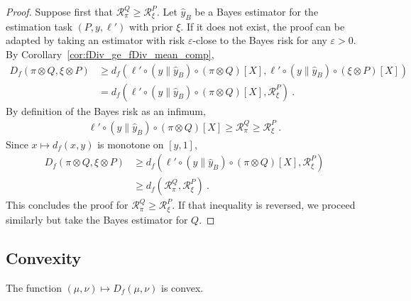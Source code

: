 \begin{proof}%
{}
Suppose first that $\mathcal R_\pi^Q \ge \mathcal R_\xi^P$.
Let $\hat{y}_B$ be a Bayes estimator for the estimation task $(P, y, \ell')$ with prior $\xi$. If it does not exist, the proof can be adapted by taking an estimator with risk $\varepsilon$-close to the Bayes risk for any $\varepsilon > 0$.
By Corollary~\ref{cor:fDiv_ge_fDiv_mean_comp},
\begin{align*}
D_f(\pi \otimes Q, \xi \otimes P)
&\ge d_f(\ell' \circ (y \parallel \hat{y}_B) \circ (\pi \otimes Q) [X], \ell' \circ (y \parallel \hat{y}_B) \circ (\xi \otimes P) [X])
\\
&= d_f(\ell' \circ (y \parallel \hat{y}_B) \circ (\pi \otimes Q) [X], \mathcal R_\xi^P)
\: .
\end{align*}
By definition of the Bayes risk as an infimum,
\begin{align*}
\ell' \circ (y \parallel \hat{y}_B) \circ (\pi \otimes Q) [X]
\ge \mathcal R_\pi^Q
\ge \mathcal R_\xi^P
\: .
\end{align*}
Since $x \mapsto d_f(x, y)$ is monotone on $[y, 1]$,
\begin{align*}
D_f(\pi \otimes Q, \xi \otimes P)
&\ge d_f(\ell' \circ (y \parallel \hat{y}_B) \circ (\pi \otimes Q) [X], \mathcal R_\xi^P)
\\
&\ge d_f(\mathcal R_\pi^Q, \mathcal R_\xi^P)
\: .
\end{align*}
This concludes the proof for $\mathcal R_\pi^Q \ge \mathcal R_\xi^P$. If that inequality is reversed, we proceed similarly but take the Bayes estimator for $Q$.
\end{proof}





\subsection{Convexity}

\begin{theorem}
  \label{thm:fDiv_convex}
  The function $(\mu, \nu) \mapsto D_f(\mu, \nu)$ is convex.
\end{theorem}


